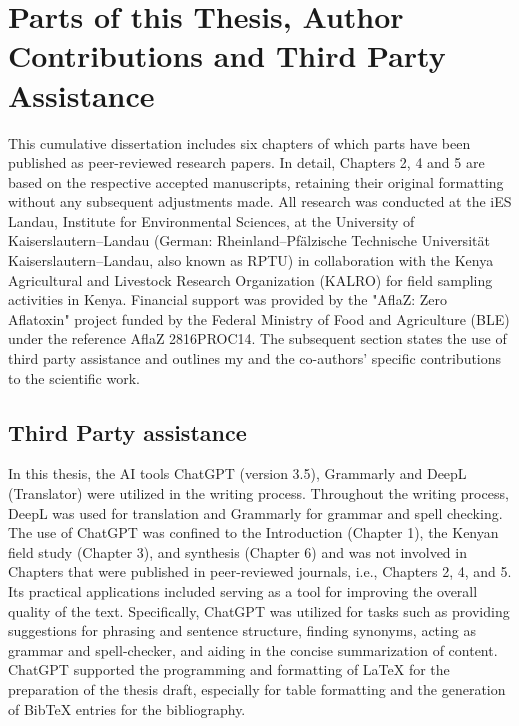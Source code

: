\chapter*{Parts of this Thesis, Author Contributions and Third Party Assistance}

This cumulative dissertation includes six chapters of which parts have been published as peer-reviewed research papers. In detail, Chapters 2, 4 and 5 are based on the respective accepted manuscripts, retaining their original formatting without any subsequent adjustments made. All research was conducted at the iES Landau, Institute for Environmental Sciences, at the University of Kaiserslautern--Landau (German: Rheinland--Pfälzische Technische Universität Kaiserslautern--Landau, also known as RPTU) in collaboration with the Kenya Agricultural and Livestock Research Organization (KALRO) for field sampling activities in Kenya. Financial support was provided by the "AflaZ: Zero Aflatoxin" project funded by the Federal Ministry of Food and Agriculture (BLE) under the reference AflaZ 2816PROC14. The subsequent section states the use of third party assistance and outlines my and the co-authors' specific contributions to the scientific work.

\section*{Third Party assistance}

In this thesis, the AI tools ChatGPT (version 3.5), Grammarly and DeepL (Translator) were utilized in the writing process. Throughout the writing process, DeepL was used for translation and Grammarly for grammar and spell checking. The use of ChatGPT was confined to the Introduction (Chapter 1), the Kenyan field study (Chapter 3), and synthesis (Chapter 6) and was not involved in Chapters that were published in peer-reviewed journals, i.e., Chapters 2, 4, and 5. Its practical applications included serving as a tool for improving the overall quality of the text. Specifically, ChatGPT was utilized for tasks such as providing suggestions for phrasing and sentence structure, finding synonyms, acting as grammar and spell-checker, and aiding in the concise summarization of content. ChatGPT supported the programming and formatting of LaTeX for the preparation of the thesis draft, especially for table formatting and the generation of BibTeX entries for the bibliography.

